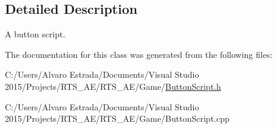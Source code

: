 \subsection{Detailed Description}
A button script. 

The documentation for this class was generated from the following files\+:\begin{DoxyCompactItemize}
\item 
C\+:/\+Users/\+Alvaro Estrada/\+Documents/\+Visual Studio 2015/\+Projects/\+R\+T\+S\+\_\+\+A\+E/\+R\+T\+S\+\_\+\+A\+E/\+Game/\hyperlink{_button_script_8h}{Button\+Script.\+h}\item 
C\+:/\+Users/\+Alvaro Estrada/\+Documents/\+Visual Studio 2015/\+Projects/\+R\+T\+S\+\_\+\+A\+E/\+R\+T\+S\+\_\+\+A\+E/\+Game/Button\+Script.\+cpp\end{DoxyCompactItemize}

